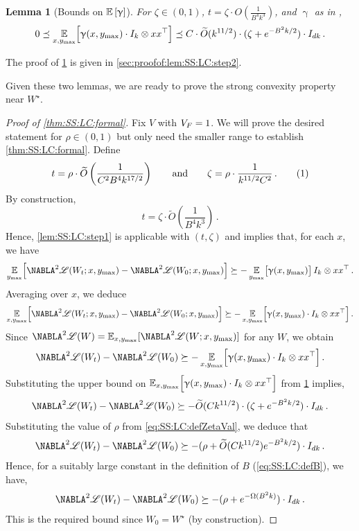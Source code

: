 \documentclass[11pt,letterpaper]{article}
\theoremstyle{plain}
\newtheorem{lemma}[theorem]{Lemma}
\theoremstyle{definition}
\theoremstyle{remark}
\newcommand{\yesnum}{\addtocounter{equation}{1}\tag{\theequation}}
\newcommand{\qquadtext}[1]{\qquad\text{#1}\qquad}
\newcommand{\qquadand}{\qquadtext{and}}
\newcommand{\inparen}[1]{\ensuremath{\left(#1\right)}}
\newcommand{\insquare}[1]{\ensuremath{\left[#1\right]}}
\let\norm\relax
\newcommand{\norm}[1]{\ensuremath{\left\lVert #1 \right\rVert}}
\newcommand{\E}{\operatornamewithlimits{\mathbb{E}}}
\newcommand{\Ex}{\E}
\newcommand*{\Nabla}{\boldsymbol\NABLA}
\let\nabla\Nabla
\newcommand{\wt}[1]{\widetilde{#1}}
\newcommand{\customcal}[1]{\euscr{#1}}
\newcommand{\cL}{\customcal{L}}
\renewcommand{\gamma}{\upgamma}
\newcommand{\negLL}{\ensuremath{\mathscr{L}}}
\newcommand{\Wstar}{{W^\star}}
\newcommand{\ymax}{y_{\max}}
\renewcommand{\cL}{\negLL}
\begin{document}
{{\begin{lemma}[Bounds on $\Ex\insquare{\gamma}$]\label{lem:SS:LC:step2}
    For 
    $\zeta\in (0, 1)$, 
    $t=\zeta\cdot O\inparen{\frac{1}{B^4k^3}}$,
    and $\gamma$ as in ,
    \[
        0\preceq \Ex_{x,\ymax}\Bigl[\gamma(x,\ymax) \cdot I_{k}\otimes xx^\top \Bigr] \preceq 
        C
            \cdot \wt{O}(k^{11/2})
            \cdot (\zeta + e^{-B^2 k/2})
            \cdot I_{dk}\,.
    \]
\end{lemma}
The proof of \cref{lem:SS:LC:step2} is given in \cref{sec:proofof:lem:SS:LC:step2}.

\medskip

Given these two lemmas, we are ready to prove the strong convexity property near $W^\star.$
\begin{proof}[Proof of \cref{thm:SS:LC:formal}]
    Fix $V$ with $\norm{V}_F=1$.
    We will prove the desired statement for $\rho\in (0,1)$
    but only need the smaller range to establish \cref{thm:SS:LC:formal}.
    Define
    \[
        t=\rho\cdot \wt{O}\inparen{\frac{1}{C^{2}B^{4}k^{17/2}}}
        \qquadand 
        \zeta=\rho\cdot \frac{1}{k^{11/2} C^{2}}\,.
        \yesnum\label{eq:SS:LC:defZetaVal}
    \]
    By construction,
    \[ 
        t = \zeta \cdot \wt{O}\inparen{\frac{1}{B^{4}k^{3}}}\,.
    \]
    Hence, \cref{lem:SS:LC:step1} is applicable with $(t,\zeta)$ and implies that, for each $x$, we have
    \[
    \Ex_{\ymax}\Bigl[\nabla^2 \cL(W_t;x,\ymax) - \nabla^2 \cL(W_0;x,\ymax)\Bigr] \succeq -\Ex_{\ymax}\bigl[\gamma(x,\ymax)\bigr]\, I_{k}\otimes xx^\top\,.
    \]
Averaging over $x$, we deduce
\[
\Ex_{x,\ymax}\Bigl[\nabla^2 \cL(W_t;x,\ymax) - \nabla^2 \cL(W_0;x,\ymax)\Bigr] \succeq -\Ex_{x,\ymax}\Bigl[\gamma(x,\ymax) \cdot I_{k}\otimes xx^\top\Bigr]\,.
\]
Since $\nabla^2 \cL(W)=\Ex_{x,\ymax}[\nabla^2 \cL(W;x,\ymax)]$ for any $W$, we obtain
\[
\nabla^2 \cL(W_t) - \nabla^2 \cL(W_0) \succeq -\Ex_{x,\ymax}\Bigl[\gamma(x,\ymax) \cdot I_{k}\otimes xx^\top\Bigr]\,.
\]
Substituting the upper bound on $\Ex_{x,\ymax}\Bigl[\gamma(x,\ymax) \cdot I_{k}\otimes xx^\top\Bigr]$ from \cref{lem:SS:LC:step2} implies, 
\[
    \nabla^2 \cL(W_t) - \nabla^2 \cL(W_0) \succeq -\wt{O}(Ck^{11/2})\cdot (\zeta+e^{-B^2k/2})\cdot I_{dk}\,.
\]
Substituting the value of $\rho$ from \cref{eq:SS:LC:defZetaVal}, we deduce that
\[
    \nabla^2 \cL(W_t) - \nabla^2 \cL(W_0) \succeq -(\rho+ \wt{O}(Ck^{11/2}) e^{-B^2k/2})\cdot I_{dk}\,.
\]
Hence, for a suitably large constant in the definition of $B$ (\cref{eq:SS:LC:defB}), we have,
\[
    \nabla^2 \cL(W_t) - \nabla^2 \cL(W_0) \succeq -(\rho + e^{-\Omega(B^2k)})\cdot I_{dk}\,.
\]
This is the required bound since $W_0=\Wstar$ (by construction).
\end{proof}



}}
\end{document}
